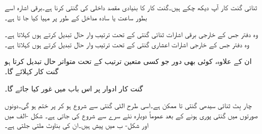 ثنائی گنت کار آپ دیکھ چکے ہیں۔گنت کار کا بنیادی مقصد  داخلی کی گنتی  کرنا ہے۔برقی اشارہ اسے بطور ساعت یا سادہ مداخل کے طور پر  مہیا کیا جا تا ہے۔

وہ  دفتر جس کے خارجی برقی اشارات  ثنائی گنتی کے تحت ترتیب وار حال تبدیل کرتے ہوں  کہلاتا ہے۔ وہ  دفتر  جس کے  خارجی اشارات اعشاری گنتی کے تحت ترتیب  وار حال تبدیل کرتے ہوں   کہلاتا ہے۔

ان کے علاوہ،   کوئی بھی دور جو کسی متعین ترتیب کے تحت  متواتر  حال تبدیل کرتا ہو  گنت کار کہلائے گا۔

گنت کار ادوار پر اس باب میں غور کیا جائے گا۔

چار بِٹ ثنائی   سیدھی  گنتی    تا    ممکن ہے۔اسی طرح الٹی گنتی   سے  شروع ہو کر      پر ختم ہو گی۔دونوں صورتوں میں گنتی پوری ہونے کے بعد   عموماً دوبارہ نئے سرے سے شروع کی جاتی ہے۔ شکل -الف  میں  اور شکل- ب  میں   پیش ہیں۔ان کی بناوٹ ملتی جلتی ہے۔


